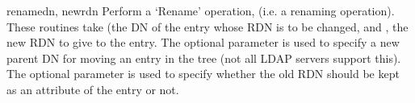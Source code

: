
\begin{methoddesc}[LDAPObject]{rename}{dn, newrdn  }
Perform a `Rename' operation, (i.e. a renaming operation).
These routines take  (the DN
of the entry whose RDN is to be changed, and , the new RDN to
give to the entry.
The optional parameter  is used to specify
a new parent DN for moving an entry in the tree
(not all LDAP servers support this).
The optional parameter  is used to specify
whether the old RDN should be kept as an attribute of the entry or not.
\end{methoddesc}


